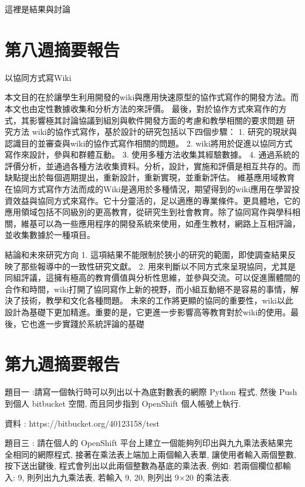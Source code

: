 \documentclass[]{article}
\begin{document}
這裡是結果與討論

\section{第八週摘要報告}\label{ux7b2cux516bux9031ux6458ux8981ux5831ux544a}

以協同方式寫Wiki

本文目的在於讓學生利用開發的wiki與應用快速原型的協作式寫作的開發方法。而本文也由定性數據收集和分析方法的來評價。
最後，對於協作方式來寫作的方式，其影響極其討論協議到組別與軟件開發方面的考慮和教學相關的要求問題
研究方法 wiki的協作式寫作，基於設計的研究包括以下四個步驟： 1.
研究的現狀與認識目的並審查與wiki的協作式寫作相關的問題。 2.
wiki將用於促進以協同方式寫作來設計，參與和群體互動。 3.
使用多種方法收集其經驗數據。 4.
通過系統的評價分析，並通過各種方法收集資料。分析，設計，實施和評價是相互共存的。而缺點提出於每個週期提出，重新設計，重新實現，並重新評估。
維基應用域教育在協同方式寫作方法而成的Wiki是適用於多種情況，期望得到的wiki應用在學習投資效益與協同方式來寫作。它十分靈活的，足以適應的專業條件。更具體地，它的應用領域包括不同級別的更高教育，從研究生到社會教育。除了協同寫作與學科相關，維基可以為一些應用程序的開發系統來使用，如產生教材，網路上互相評論，並收集數據於一種項目。

結論和未來研究方向 1.
這項結果不能限制於狹小的研究的範圍，即使調查結果反映了那些報導中的一致性研究文獻。
2.
用來判斷以不同方式來呈現協同，尤其是同組評議，這擁有極高的教育價值與分析性思維，並參與交流。可以促進團體間的合作和時間，wiki打開了協同寫作上新的視野，而小組互動絕不是容易的事情，解決了技術，教學和文化各種問題。
未來的工作將更顯的協同的重要性，wiki以此設計為基礎下更加精進。重要的是，它更進一步影響高等教育對於wiki的使用。最後，它也進一步實踐於系統評論的基礎

\section{第九週摘要報告}\label{ux7b2cux4e5dux9031ux6458ux8981ux5831ux544a}

題目一 :請寫一個執行時可以列出以十為底對數表的網際 Python 程式, 然後
Push 到個人 bitbucket 空間, 而且同步指到 OpenShift 個人帳號上執行.

資料 : https://bitbucket.org/40123158/test

題目三 : 請在個人的 OpenShift
平台上建立一個能夠列印出與九九乘法表結果完全相同的網際程式,
接著在乘法表上端加上兩個輸入表單, 讓使用者輸入兩個整數, 按下送出鍵後,
程式會列出以此兩個整數為基底的乘法表, 例如: 若兩個欄位都輸入: 9,
則列出九九乘法表, 若輸入 9, 20, 則列出 9×20 的乘法表.
\end{document}
